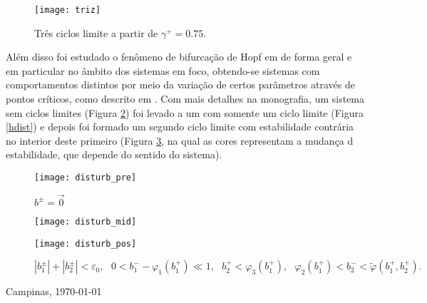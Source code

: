 \documentclass[12pt]{article}
\begin{document}
\begin{figure}[H]
\centering
\texttt{[image: triz]}\\
\vspace{\baselineskip}
\caption{\label{triz}Três ciclos limite a partir de $\gamma^+=0.75$.}
\end{figure}
Além disso foi estudado o fenômeno de bifurcação de Hopf em \cite{Kuznetsov:1998} de forma geral e em particular no âmbito dos sistemas em foco, obtendo-se sistemas com comportamentos distintos por meio da variação de certos parâmetros através de pontos críticos, como descrito em \cite{HAN20102399}. Com mais detalhes na monografia, um sistema sem ciclos limites (Figura \ref{undist}) foi levado a um com somente um ciclo limite (Figura \ref{hdist}) e depois foi formado um segundo ciclo limite com estabilidade contrária no interior deste primeiro (Figura \ref{dist}, na qual as cores representam a mudança d estabilidade, que depende do sentido do sistema).
\begin{figure}[H]
\centering
\texttt{[image: disturb\_pre]}\\
\caption{\label{undist}$b^\pm=\vec{0}$}
\end{figure}

\begin{figure}[H]
\texttt{[image: disturb\_mid]}\\
\caption{\label{hdist}$\left|b_{1}^{\pm}\right|+\left|b_{2}^{\pm}\right|<\varepsilon_{0},\text{ }0<\varphi_{1}\left(b_{1}^{+}\right)-b_{1}^{-} \ll 1,\text{ }b_{2}^{+}<\varphi_{3}\left(b_{1}^{+}\right),\text{ }  \varphi_{2}\left(b_{1}^{+}\right)<b_{2}^{-}<\tilde{\varphi}\left(b_{1}^{+}, b_{2}^{+}\right).$}
\endminipage
\hspace{0.1\textwidth}
\texttt{[image: disturb\_pos]}\\
\caption{\label{dist}$\left|b_{1}^{\pm}\right|+\left|b_{2}^{\pm}\right|<\varepsilon_{0},\text{ }0<b_{1}^{-}-\varphi_{1}\left(b_{1}^{+}\right) \ll 1,\text{ }b_{2}^{+}<\varphi_{3}\left(b_{1}^{+}\right),\text{ }  \varphi_{2}\left(b_{1}^{+}\right)<b_{2}^{-}<\tilde{\varphi}\left(b_{1}^{+}, b_{2}^{+}\right).$}
\endminipage
\end{figure}






\bigskip

\bigskip

Campinas, \today
\end{document}
